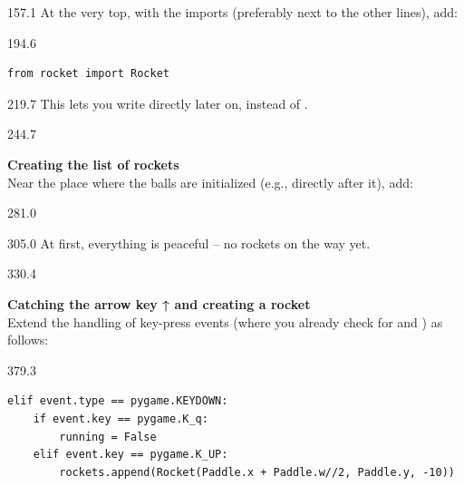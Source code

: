 \documentclass{aslab}
\begin{document}
\begin{region}[x=74.7,right=0]{157.1}
At the very top, with the imports (preferably next to the other
 lines), add:
\end{region}

\begin{region}[x=74.7,right=0]{194.6}
\begin{lstlisting}[style=py]
from rocket import Rocket
\end{lstlisting}
\end{region}

\begin{region}[x=74.7,right=0]{219.7}
This lets you write  directly later on, instead of
.
\end{region}

\begin{region}{244.7}
\begin{ntasks}[start=2]
\item \textbf{Creating the list of rockets}\\
  Near the place where the balls are initialized (e.g., directly after it),
  add:
\end{ntasks}
\end{region}

\begin{region}[x=74.7,right=0]{281.0}
\end{region}

\begin{region}[x=74.7,right=0]{305.0}
At first, everything is peaceful -- no rockets on the way yet.
\end{region}

\begin{region}[pitch=12.3]{330.4}
\begin{ntasks}[start=3]
\item \textbf{Catching the arrow key ↑ and creating a rocket}\\
  Extend the handling of key-press events (where you already check for
   and ) as follows:
\end{ntasks}
\end{region}

\begin{region}[x=74.7,right=0]{379.3}
\begin{lstlisting}[style=py]
elif event.type == pygame.KEYDOWN:
    if event.key == pygame.K_q:
        running = False
    elif event.key == pygame.K_UP:
        rockets.append(Rocket(Paddle.x + Paddle.w//2, Paddle.y, -10))
\end{lstlisting}
\end{region}
\end{document}
